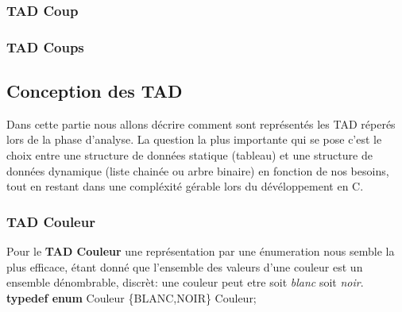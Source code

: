 \subsubsection{TAD Coup}
    \begin{algorithme}
\end{algorithme}

\subsubsection{TAD Coups}
    \begin{algorithme}
    \end{algorithme}
    \subsection{Conception des TAD}
    Dans cette partie nous allons décrire comment sont représentés les TAD réperés lors de la phase d'analyse. La question la plus importante qui se pose c'est le choix entre une structure de données statique (tableau) et une structure de données dynamique (liste chainée ou arbre binaire) en fonction de nos besoins, tout en restant dans une compléxité gérable lors du dévéloppement en C.
    \subsubsection{TAD Couleur}
    Pour le \textbf{TAD Couleur} une représentation par une énumeration nous semble la plus efficace, étant donné que l'ensemble des valeurs d'une couleur est un ensemble dénombrable, discrèt: une couleur peut etre soit \textit{blanc} soit \textit{noir}. \\
    
    \textbf{typedef enum} Couleur \{BLANC,NOIR\} Couleur;
